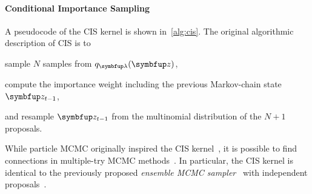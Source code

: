 \paragraph{Conditional Importance Sampling}
A pseudocode of the CIS kernel is shown in~\cref{alg:cis}.
The original algorithmic description of CIS is to
\begin{enumerate*}[label=(\roman*)]
  \item sample \(N\) samples from \(q_{\vlambda}(\vz)\),
  \item compute the importance weight including the previous Markov-chain state \(\vz_{t-1}\),
  \item and resample \(\vz_{t-1}\) from the multinomial distribution of the \(N+1\) proposals.
\end{enumerate*}
%
While particle MCMC originally inspired the CIS kernel~\citep{andrieu_particle_2010}, it is possible to find connections in multiple-try MCMC methods~\citep{martino_review_2018}.
In particular, the CIS kernel is identical to the previously proposed \textit{ensemble MCMC sampler}~\citep{neal_mcmc_2011a, austad_parallel_2007} with independent proposals~\citep[Table 12]{martino_review_2018}.

\vspace{-0.1in}
